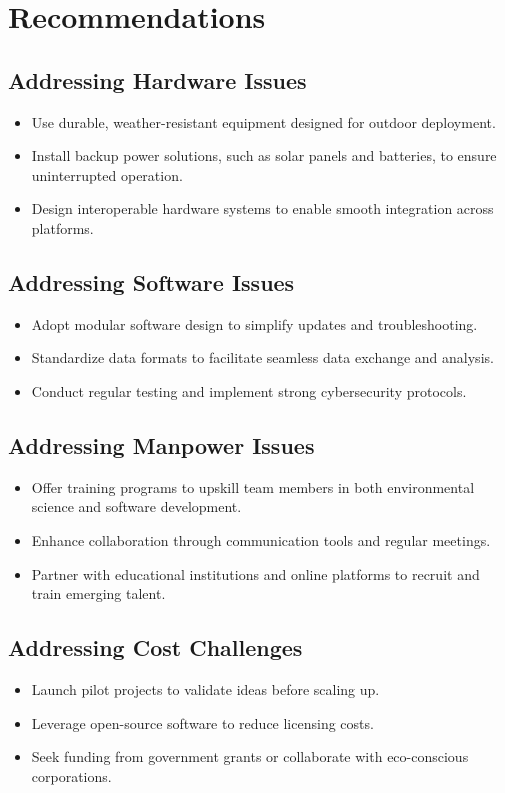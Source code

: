 \documentclass[12pt, a4paper]{article} %
\begin{document}
\section{Recommendations}

\subsection{Addressing Hardware Issues}
\begin{itemize}
    \item Use durable, weather-resistant equipment designed for outdoor deployment.
    \item Install backup power solutions, such as solar panels and batteries, to ensure uninterrupted operation.
    \item Design interoperable hardware systems to enable smooth integration across platforms.
\end{itemize}

\subsection{Addressing Software Issues}
\begin{itemize}
    \item Adopt modular software design to simplify updates and troubleshooting.
    \item Standardize data formats to facilitate seamless data exchange and analysis.
    \item Conduct regular testing and implement strong cybersecurity protocols.
\end{itemize}

\subsection{Addressing Manpower Issues}
\begin{itemize}
    \item Offer training programs to upskill team members in both environmental science and software development.
    \item Enhance collaboration through communication tools and regular meetings.
    \item Partner with educational institutions and online platforms to recruit and train emerging talent.
\end{itemize}

\subsection{Addressing Cost Challenges}
\begin{itemize}
    \item Launch pilot projects to validate ideas before scaling up.
    \item Leverage open-source software to reduce licensing costs.
    \item Seek funding from government grants or collaborate with eco-conscious corporations.
\end{itemize}
\end{document}
